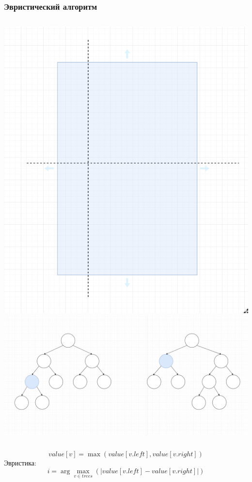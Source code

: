 \documentclass{beamer}
\begin{document}
\begin{frame}
\frametitle{Эвристический алгоритм}
\begin{columns}
    \includegraphics[width=\textwidth]{split.png}
    \includegraphics[width=\textwidth]{tree.png}
\end{columns}
    \vfill
    \[
        value[v] = \max(value[v.left], value[v.right])
    \]Эвристика: 
    \[
        i = \arg \max_{v \in trees}(|value[v.left] - value[v.right]|)
    \]
\end{frame}
\end{document}
